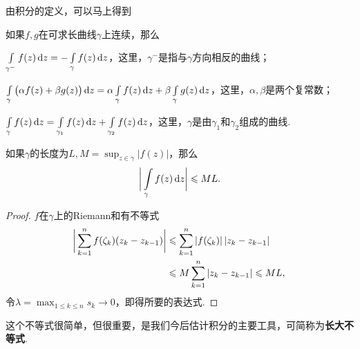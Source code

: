 由积分的定义，可以马上得到
\begin{prop}\label{prop3.1.5}
  如果$f,g$在可求长曲线$\gamma$上连续，那么
  \begin{eenum}
    \item \label{prop3.1.5.1} $\int\limits_{\gamma^-}f(z)\dz=-\int\limits_\gamma f(z)\dz$，这里，$\gamma^-$是指与$\gamma$方向相反的曲线；
    \item \label{prop3.1.5.2} $\int\limits_\gamma\big(\alpha f(z)+\beta g(z)\big)\dz
        =\alpha\int\limits_\gamma f(z)\dz+\beta\int\limits_\gamma g(z)\dz$，这里，$\alpha,\beta$是两个复常数；
    \item \label{prop3.1.5.3} $\int\limits_\gamma f(z)\dz=\int\limits_{\gamma_1}f(z)\dz+\int\limits_{\gamma_2}f(z)\dz$，这里，$\gamma$是由$\gamma_1$和$\gamma_2$组成的曲线.
  \end{eenum}
\end{prop}

\begin{prop}\label{prop3.1.6}
  如果$\gamma$的长度为$L,M=\sup_{z\in\gamma}|f(z)|$，那么
\begin{equation}\label{eq3.1.4}
  \bigg|\int\limits_\gamma f(z)\dz\bigg|\le ML.
\end{equation}
\end{prop}
\begin{proof}
  $f$在$\gamma$上的Riemann和有不等式
  \begin{align*}
    \bigg| \sum_{k=1}^nf(\zeta_k)(z_k-z_{k-1}) \bigg|&
    \le \sum_{k=1}^n|f(\zeta_k)|\,|z_k-z_{k-1}|\\
    & \le  M\sum_{k=1}^n|z_k-z_{k-1}|\le ML, \qedhere
  \end{align*}
令$\lambda=\max_{1\le k\le n}s_k\to0$，即得所要的表达式.
\end{proof}

这个不等式很简单，但很重要，是我们今后估计积分的主要工具，可简称为\textbf{长大不等式}.

